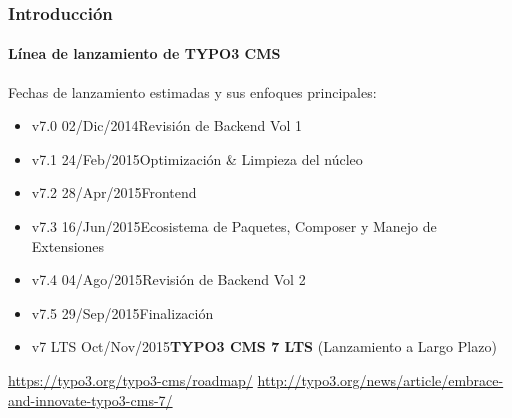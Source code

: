 \begin{frame}[fragile]
	\frametitle{Introducción}
	\framesubtitle{Línea de lanzamiento de TYPO3 CMS}

	Fechas de lanzamiento estimadas y sus enfoques principales:

	\begin{itemize}
		\item v7.0 \tabto{1.1cm}02/Dic/2014\tabto{3.4cm}Revisión de Backend Vol 1
		\item v7.1 \tabto{1.1cm}24/Feb/2015\tabto{3.4cm}Optimización \& Limpieza del núcleo
		\item v7.2 \tabto{1.1cm}28/Apr/2015\tabto{3.4cm}Frontend
		\item v7.3 \tabto{1.1cm}16/Jun/2015\tabto{3.4cm}Ecosistema de Paquetes, Composer\newline
			\tabto{3.4cm}y Manejo de Extensiones
		\item v7.4 \tabto{1.1cm}04/Ago/2015\tabto{3.4cm}Revisión de Backend Vol 2

		\item
			\begingroup
				\color{typo3orange}
					v7.5 \tabto{1.1cm}29/Sep/2015\tabto{3.4cm}Finalización
			\endgroup

		\item v7 LTS \tabto{1.1cm}Oct/Nov/2015\tabto{3.4cm}\textbf{TYPO3 CMS 7 LTS} (Lanzamiento a Largo Plazo)
	\end{itemize}

	\smaller
		\url{https://typo3.org/typo3-cms/roadmap/}\newline
		\url{http://typo3.org/news/article/embrace-and-innovate-typo3-cms-7/}
	\normalsize

\end{frame}


